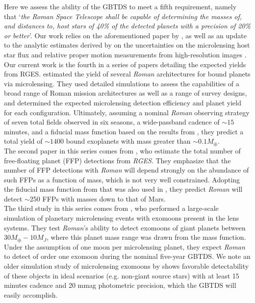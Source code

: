 \documentclass[twocolumn]{aastex631}
\begin{document}
\indent Here we assess the ability of the GBTDS to meet a fifth requirement, namely that `\textit{the Roman Space Telescope shall be capable of determining the masses of, and distances to, host stars of 40\% of the detected planets with a precision of 20\% or better}'.  Our work relies on the aforementioned paper by \cite{zohrabi:inprep}, as well as an update to the analytic estimates derived by \cite{bennett:2007a} on the uncertainties on the microlensing host star flux and relative proper motion measurements from high-resolution images \citep{verma:inprep}.\\
\indent Our current work is the fourth in a series of papers detailing the expected yields from RGES. \cite{penny19} estimated the yield of several \textit{Roman} architectures for bound planets via microlensing. They used detailed simulations to assess the capabilities of a broad range of Roman mission architectures as well as a range of survey designs, and determined the expected microlensing detection efficiency and planet yield for each configuration. Ultimately, assuming a nominal \textit{Roman} observing strategy of seven total fields observed in six seasons, a wide-passband cadence of ${\sim}15$ minutes, and a fiducial mass function based on the results from \cite{cassan:2012a}, they predict a total yield of ${\sim}1400$ bound exoplanets with mass greater than ${\sim}0.1M_{\oplus}$. \\
\indent The second paper in this series comes from \cite{johnson:2020a}, who estimate the total number of free-floating planet (FFP) detections from \textit{RGES}. They emphasize that the number of FFP detections with \textit{Roman} will depend strongly on the abundance of such FFPs as a function of mass, which is not very well constrained. Adopting the fiducial mass function from \cite{cassan:2012a} that was also used in \cite{penny19}, they predict \textit{Roman} will detect ${\sim}$250 FFPs with masses down to that of Mars.\\
\indent The third study in this series comes from \cite{lastovka:2025a}, who performed a large-scale simulation of planetary microlensing events with exomoons present in the lens systems. They test \textit{Roman}'s ability to detect exomoons of giant planets between $30M_{\oplus}-10M_J$, where this planet mass range was drawn from the \cite{cassan:2012a} mass function. Under the assumption of one moon per microlensing planet, they expect \textit{Roman} to detect of order one exomoon during the nominal five-year GBTDS. We note an older simulation study of microlensing exomoons by \cite{liebig:2010a} shows favorable detectability of these objects in ideal scenarios (e.g. non-giant source stars) with at least 15 minutes cadence and 20 mmag photometric precision, which the GBTDS will easily accomplish. \\
\end{document}
